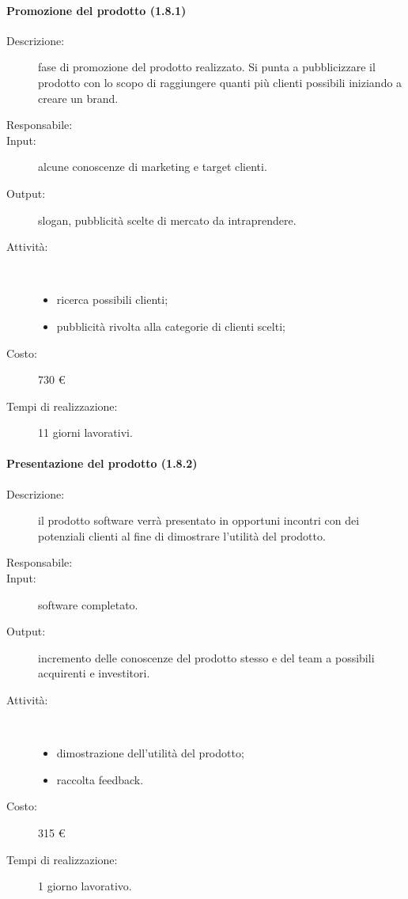 \paragraph{Promozione del prodotto (1.8.1)}
\begin{description}
\item[Descrizione:] fase di promozione del prodotto realizzato. Si punta a pubblicizzare il prodotto con lo scopo di raggiungere quanti pi\`{u} clienti possibili iniziando a creare un brand.
\item[Responsabile:] 
\item[Input:] alcune conoscenze di marketing e target clienti.
\item[Output:] slogan, pubblicità scelte di mercato da intraprendere.
\item[Attività:]\mbox{}\\[-1.5\baselineskip]
	\begin{itemize}
	\item ricerca possibili clienti;
	\item pubblicità rivolta alla categorie di clienti scelti;
	\end{itemize}
\item[Costo:] 730 \euro{}
\item[Tempi di realizzazione:] 11 giorni lavorativi.
\end{description}

\paragraph{Presentazione del prodotto (1.8.2)}
\begin{description}
\item[Descrizione:] il prodotto software verr\`{a} presentato in opportuni incontri con dei potenziali clienti al fine di dimostrare l'utilit\`{a} del prodotto.
\item[Responsabile:] 
\item[Input:] software completato.
\item[Output:] incremento delle conoscenze del prodotto stesso e del team a possibili acquirenti e investitori. 
\item[Attività:]\mbox{}\\[-1.5\baselineskip]
	\begin{itemize}
	\item dimostrazione dell'utilit\`{a} del prodotto;
	\item raccolta feedback.
	\end{itemize}
\item[Costo:] 315 \euro{}
\item[Tempi di realizzazione:] 1 giorno lavorativo.
\end{description}
